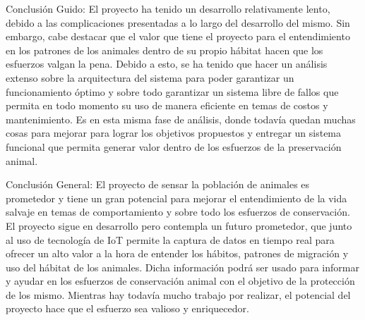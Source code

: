 Conclusión Guido: El proyecto ha tenido un desarrollo relativamente lento, debido a las complicaciones presentadas a lo largo del desarrollo del mismo. Sin embargo, cabe destacar que el valor que tiene el proyecto para el entendimiento en los patrones de los animales dentro de su propio hábitat hacen que los esfuerzos valgan la pena. Debido a esto, se ha tenido que hacer un análisis extenso sobre la arquitectura del sistema para poder garantizar un funcionamiento óptimo y sobre todo garantizar un sistema libre de fallos que permita en todo momento su uso de manera eficiente en temas de costos y mantenimiento. Es en esta misma fase de análisis, donde todavía quedan muchas cosas para mejorar para lograr los objetivos propuestos y entregar un sistema funcional que permita generar valor dentro de los esfuerzos de la preservación animal.
\newline

Conclusión General: El proyecto de sensar la población de animales es prometedor y tiene un gran potencial para mejorar el entendimiento de la vida salvaje en temas de comportamiento y sobre todo los esfuerzos de conservación. El proyecto sigue en desarrollo pero contempla un futuro prometedor, que junto al uso de tecnología de IoT permite la captura de datos en tiempo real para ofrecer un alto valor a la hora de entender los hábitos, patrones de migración y uso del hábitat de los animales. Dicha información podrá ser usado para informar y ayudar en los esfuerzos de conservación animal con el objetivo de la protección de los mismo. Mientras hay todavía mucho trabajo por realizar, el potencial del proyecto hace que el esfuerzo sea valioso y enriquecedor.